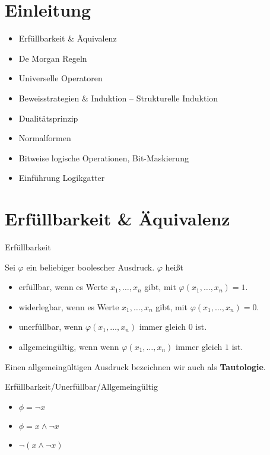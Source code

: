 \documentclass[12pt%
,aspectratio=169%
]{beamer}
\begin{document}
\section{Einleitung}
\begin{frame}{}
\begin{itemize}
	\item Erfüllbarkeit \& Äquivalenz
	\item De Morgan Regeln
	\item Universelle Operatoren
	\item Beweisstrategien \& Induktion -- Strukturelle Induktion
	\item Dualitätsprinzip
	\item Normalformen
	\item Bitweise logische Operationen, Bit-Maskierung
	\item Einführung Logikgatter
\end{itemize}
\end{frame}

\section{Erfüllbarkeit \& Äquivalenz}
\begin{frame}{Erfüllbarkeit}
	\begin{definition}[Erfüllbarkeit]
		Sei $\varphi$ ein beliebiger boolescher Ausdruck. $\varphi$ heißt
		\begin{itemize}
			\item erfüllbar, wenn es Werte $x_1, \ldots, x_n$ gibt, mit $\varphi (x_1, \ldots, x_n ) = 1$.
			\item widerlegbar, wenn es Werte $x_1, \ldots, x_n$ gibt, mit $\varphi (x_1, \ldots, x_n) = 0$.
			\item unerfüllbar, wenn $\varphi (x_1 ,\ldots , x_n )$ immer gleich $0$ ist.
			\item allgemeingültig, wenn wenn $\varphi (x_1 ,\ldots , x_n )$ immer gleich $1$ ist.
		\end{itemize}
		Einen allgemeingültigen Ausdruck bezeichnen wir auch als \textbf{Tautologie}.
	\end{definition}
\end{frame}

\begin{frame}{Erfüllbarkeit/Unerfüllbar/Allgemeingültig}
\begin{itemize}
	\item $\phi = \neg x$
	\item $\phi = x \land \neg x$
	\item $\neg (x \land \neg x)$
\end{itemize}
\end{frame}
\end{document}
